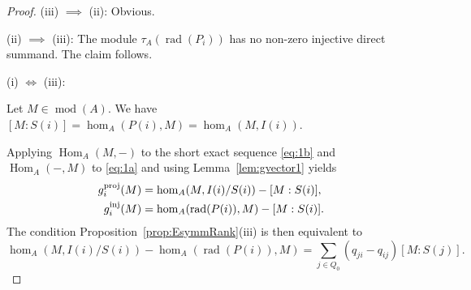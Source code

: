 \documentclass[12pt,reqno]{amsart}
\theoremstyle{definition}
\newcommand{\md}{\operatorname{mod}}
\newcommand{\rad}{\operatorname{rad}}
\newcommand{\Hom}{\operatorname{Hom}}
\begin{document}
\begin{proof}
(iii) $\implies$ (ii): Obvious.

(ii) $\implies$ (iii):
The module $\tau_A(\rad(P_i))$ has no non-zero injective direct summand.
The claim follows.

(i) $\iff$ (iii):

Let $M \in \md(A)$.
We have $[M:S(i)] = \hom_A(P(i),M) = \hom_A(M,I(i))$.

Applying $\Hom_A(M,-)$ to the short exact sequence \eqref{eq:1b} and $\Hom_A(-,M)$ to 
\eqref{eq:1a}  and using Lemma~\ref{lem:gvector1} yields
\begin{align*}
g_i^{\rm proj}(M) &= \hom_A(M,I(i)/S(i)) - [M:S(i)],
\\
g_i^{\rm inj}(M) &= \hom_A(\rad(P(i)),M) - [M:S(i)].
\end{align*}
The condition Proposition~\ref{prop:EsymmRank}(iii) is then equivalent to
\begin{equation}\label{eq:2}
\hom_A(M,I(i)/S(i)) - \hom_A(\rad(P(i)),M) =
\sum_{j \in Q_0} (q_{ji}-q_{ij}) [M:S(j)].
\end{equation}


\end{proof}
\end{document}
